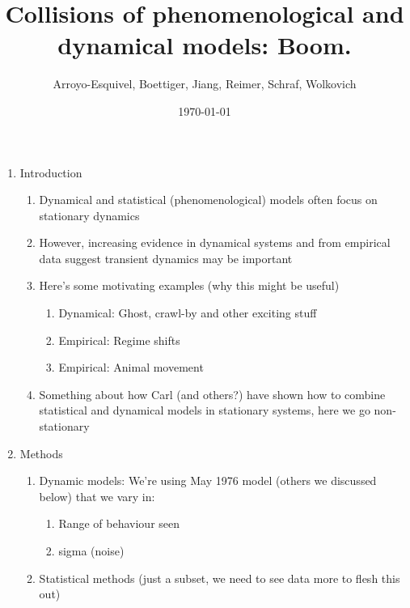 \documentclass[11pt,letter]{article}
\begin{document}

\renewcommand{\refname}{\CHead{}}

\title{Collisions of phenomenological and dynamical models: Boom.}
\author{Arroyo-Esquivel, Boettiger, Jiang, Reimer, Schraf, Wolkovich}
\date{\today}
\maketitle

\begin{enumerate}
\item Introduction
\begin{enumerate} %
\item Dynamical and statistical (phenomenological) models often focus on stationary dynamics 
\item However, increasing evidence in dynamical systems and from empirical data suggest transient dynamics may be important
\item Here's some motivating examples (why this might be useful)
\begin{enumerate}
\item Dynamical: Ghost, crawl-by and other exciting stuff
\item Empirical: Regime shifts
\item Empirical: Animal movement %
\end{enumerate}
\item Something about how Carl (and others?) have shown how to combine statistical and dynamical models in stationary systems, here we go non-stationary
\end{enumerate}
\item Methods
\begin{enumerate}
\item Dynamic models: We're using May 1976 model (others we discussed below) that we vary in:
\begin{enumerate}
\item Range of behaviour seen
\item sigma (noise)
\end{enumerate}
\item Statistical methods (just a subset, we need to see data more to flesh this out)
\begin{enumerate}

\end{enumerate}
\end{enumerate}
\end{enumerate}
\end{document}
